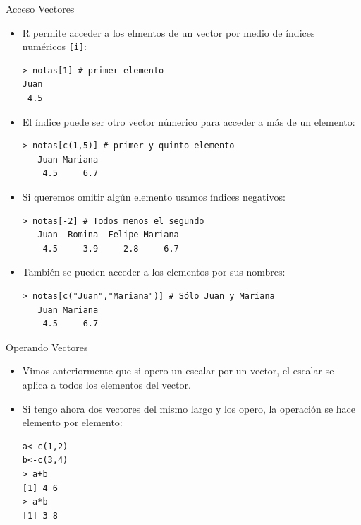 \documentclass[handout]{beamer}
\begin{document}
\begin{frame}[fragile]{Acceso  Vectores}
\scriptsize{
\begin{itemize}

 \item R permite acceder a los elmentos de un vector por medio de índices numéricos \verb+[i]+: 
\begin{verbatim}
> notas[1] # primer elemento
Juan 
 4.5
\end{verbatim}

\item El índice puede ser otro vector númerico para acceder a más de un elemento:
\begin{verbatim}
> notas[c(1,5)] # primer y quinto elemento
   Juan Mariana 
    4.5     6.7 
\end{verbatim}

\item Si queremos omitir algún elemento usamos índices negativos:
\begin{verbatim}
> notas[-2] # Todos menos el segundo
   Juan  Romina  Felipe Mariana 
    4.5     3.9     2.8     6.7 
\end{verbatim}

\item También se pueden acceder a los elementos por sus nombres:
\begin{verbatim}
> notas[c("Juan","Mariana")] # Sólo Juan y Mariana
   Juan Mariana 
    4.5     6.7 
\end{verbatim}



\end{itemize}

 

 }
\end{frame}


\begin{frame}[fragile]{Operando Vectores}
\scriptsize{
\begin{itemize}
 \item Vimos anteriormente que si opero un escalar por un vector, el escalar se aplica a todos los elementos del vector.
 \item Si tengo ahora dos vectores del mismo largo y los opero, la operación se hace elemento por elemento:
\begin{verbatim}
a<-c(1,2)
b<-c(3,4)
> a+b
[1] 4 6
> a*b
[1] 3 8
\end{verbatim}

\end{itemize}
 }
\end{frame}
\end{document}
